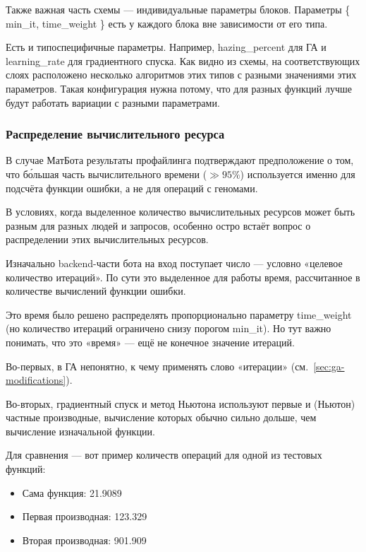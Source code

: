 \documentclass[11pt]{article}
\begin{document}
    Также важная часть схемы — индивидуальные параметры блоков.
    Параметры \{ min\_it, time\_weight \} есть у каждого блока вне зависимости от его типа.

    Есть и типоспецифичные параметры.
    Например, hazing\_percent для ГА и learning\_rate для градиентного спуска.
    Как видно из схемы, на соответствующих слоях расположено несколько алгоритмов этих типов с разными значениями этих параметров.
    Такая конфигурация нужна потому, что для разных функций лучше будут работать вариации с разными параметрами.

    \subsubsection{Распределение вычислительного ресурса}\label{subsubsec:resource-distribution}

    В случае МатБота результаты профайлинга подтверждают предположение о том, что бо́льшая часть вычислительного времени ($\gg 95\%$)
    используется именно для подсчёта функции ошибки, а не для операций с геномами.

    В условиях, когда выделенное количество вычислительных ресурсов может быть разным для разных людей и запросов,
    особенно остро встаёт вопрос о распределении этих вычислительных ресурсов.

    Изначально backend-части бота на вход поступает число — условно «целевое количество итераций».
    По сути это выделенное для работы время, рассчитанное в количестве вычислений функции ошибки.

    Это время было решено распределять пропорционально параметру time\_weight (но количество итераций ограничено снизу порогом min\_it).
    Но тут важно понимать, что это «время» — ещё не конечное значение итераций.

    Во-первых, в ГА непонятно, к чему применять слово «итерации» (см.~\ref{sec:ga-modifications}).

    Во-вторых, градиентный спуск и метод Ньютона используют первые и (Ньютон) частные производные,
    вычисление которых обычно сильно дольше, чем вычисление изначальной функции.

    Для сравнения — вот пример количеств операций для одной из тестовых функций:
    \begin{itemize}
        \item Сама функция: 21.9089
        \item Первая производная: 123.329
        \item Вторая производная: 901.909
    \end{itemize}
\end{document}
